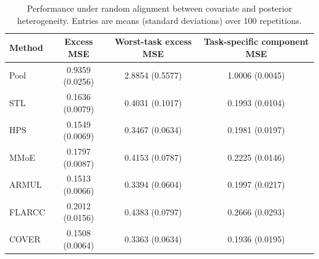 \begin{table}[H]
\centering
\small
\begin{tabular}{lccc}
\toprule
Method & Excess MSE & Worst-task excess MSE & Task-specific component MSE \\
\midrule
Pool & 0.9359 (0.0256) & 2.8854 (0.5577) & 1.0006 (0.0045) \\
STL & 0.1636 (0.0079) & 0.4031 (0.1017) & 0.1993 (0.0104) \\
HPS & 0.1549 (0.0069) & 0.3467 (0.0634) & 0.1981 (0.0197) \\
MMoE & 0.1797 (0.0087) & 0.4153 (0.0787) & 0.2225 (0.0146) \\
ARMUL & 0.1513 (0.0066) & 0.3394 (0.0604) & 0.1997 (0.0217) \\
FLARCC & 0.2012 (0.0156) & 0.4383 (0.0797) & 0.2666 (0.0293) \\
COVER & 0.1508 (0.0064) & 0.3363 (0.0634) & 0.1936 (0.0195) \\
\bottomrule
\end{tabular}
\caption{Performance under random alignment between covariate and posterior heterogeneity. Entries are means (standard deviations) over 100 repetitions.}
\label{tab:random-alignment}
\end{table}
